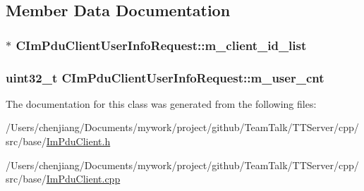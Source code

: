 \subsection{Member Data Documentation}
\hypertarget{class_c_im_pdu_client_user_info_request_a78223db2160867ea487da58d602997ce}{}
\subsubsection[{m\+\_\+client\+\_\+id\+\_\+list}]{$\ast$ C\+Im\+Pdu\+Client\+User\+Info\+Request\+::m\+\_\+client\+\_\+id\+\_\+list\hspace{0.3cm}{\ttfamily [private]}}\label{class_c_im_pdu_client_user_info_request_a78223db2160867ea487da58d602997ce}
\hypertarget{class_c_im_pdu_client_user_info_request_a50f4b8380f0dce84a05618078030631a}{}
\subsubsection[{m\+\_\+user\+\_\+cnt}]{\setlength{\rightskip}{0pt plus 5cm}uint32\+\_\+t C\+Im\+Pdu\+Client\+User\+Info\+Request\+::m\+\_\+user\+\_\+cnt\hspace{0.3cm}{\ttfamily [private]}}\label{class_c_im_pdu_client_user_info_request_a50f4b8380f0dce84a05618078030631a}


The documentation for this class was generated from the following files\+:\begin{DoxyCompactItemize}
\item 
/\+Users/chenjiang/\+Documents/mywork/project/github/\+Team\+Talk/\+T\+T\+Server/cpp/src/base/\hyperlink{_im_pdu_client_8h}{Im\+Pdu\+Client.\+h}\item 
/\+Users/chenjiang/\+Documents/mywork/project/github/\+Team\+Talk/\+T\+T\+Server/cpp/src/base/\hyperlink{_im_pdu_client_8cpp}{Im\+Pdu\+Client.\+cpp}\end{DoxyCompactItemize}

